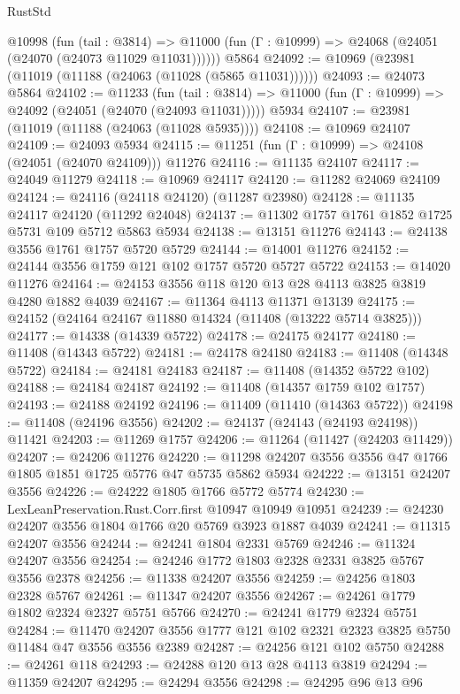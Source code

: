\begin{lexlean}{RustStd}
\begin{coremodule}
    @10998
      (fun (tail : @3814) =>
      @11000 (fun (Γ : @10999) => @24068 (@24051 (@24070 (@24073 @11029 @11031))))))
    @5864
@24092 := @10969 (@23981 (@11019 (@11188 (@24063 (@11028 (@5865 @11031))))))
@24093 := @24073 @5864
@24102 := @11233
    (fun (tail : @3814) => @11000 (fun (Γ : @10999) => @24092 (@24051 (@24070 (@24093 @11031)))))
    @5934
@24107 := @23981 (@11019 (@11188 (@24063 (@11028 @5935))))
@24108 := @10969 @24107
@24109 := @24093 @5934
@24115 := @11251 (fun (Γ : @10999) => @24108 (@24051 (@24070 @24109))) @11276
@24116 := @11135 @24107
@24117 := @24049 @11279
@24118 := @10969 @24117
@24120 := @11282 @24069 @24109
@24124 := @24116 (@24118 @24120) (@11287 @23980)
@24128 := @11135 @24117 @24120 (@11292 @24048)
@24137 := @11302 @1757 @1761 @1852 @1725 @5731 @109 @5712 @5863 @5934
@24138 := @13151 @11276
@24143 := @24138 @3556 @1761 @1757 @5720 @5729
@24144 := @14001 @11276
@24152 := @24144 @3556 @1759 @121 @102 @1757 @5720 @5727 @5722
@24153 := @14020 @11276
@24164 := @24153 @3556 @118 @120 @13 @28 @4113 @3825 @3819 @4280 @1882 @4039
@24167 := @11364 @4113 @11371 @13139
@24175 := @24152 (@24164 @24167 @11880 @14324 (@11408 (@13222 @5714 @3825)))
@24177 := @14338 (@14339 @5722)
@24178 := @24175 @24177
@24180 := @11408 (@14343 @5722)
@24181 := @24178 @24180
@24183 := @11408 (@14348 @5722)
@24184 := @24181 @24183
@24187 := @11408 (@14352 @5722 @102)
@24188 := @24184 @24187
@24192 := @11408 (@14357 @1759 @102 @1757)
@24193 := @24188 @24192
@24196 := @11409 (@11410 (@14363 @5722))
@24198 := @11408 (@24196 @3556)
@24202 := @24137 (@24143 (@24193 @24198)) @11421
@24203 := @11269 @1757
@24206 := @11264 (@11427 (@24203 @11429))
@24207 := @24206 @11276
@24220 := @11298 @24207 @3556 @3556 @47 @1766 @1805 @1851 @1725 @5776 @47 @5735 @5862 @5934
@24222 := @13151 @24207 @3556
@24226 := @24222 @1805 @1766 @5772 @5774
@24230 := LexLeanPreservation.Rust.Corr.first @10947 @10949 @10951
@24239 := @24230 @24207 @3556 @1804 @1766 @20 @5769 @3923 @1887 @4039
@24241 := @11315 @24207 @3556
@24244 := @24241 @1804 @2331 @5769
@24246 := @11324 @24207 @3556
@24254 := @24246 @1772 @1803 @2328 @2331 @3825 @5767 @3556 @2378
@24256 := @11338 @24207 @3556
@24259 := @24256 @1803 @2328 @5767
@24261 := @11347 @24207 @3556
@24267 := @24261 @1779 @1802 @2324 @2327 @5751 @5766
@24270 := @24241 @1779 @2324 @5751
@24284 := @11470 @24207 @3556 @1777 @121 @102 @2321 @2323 @3825 @5750 @11484 @47 @3556 @3556 @2389
@24287 := @24256 @121 @102 @5750
@24288 := @24261 @118
@24293 := @24288 @120 @13 @28 @4113 @3819
@24294 := @11359 @24207
@24295 := @24294 @3556
@24298 := @24295 @96 @13 @96

\end{coremodule}
\end{lexlean}
